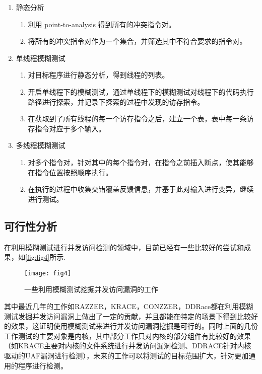\begin{enumerate}
\item 静态分析
\begin{enumerate}
\item 利用 point-to-analysis 得到所有的冲突指令对。
\item 将所有的冲突指令对作为一个集合，并筛选其中不符合要求的指令对。
\end{enumerate}

\item 单线程模糊测试
\begin{enumerate}
\item 对目标程序进行静态分析，得到线程的列表。
\item 开启单线程下的模糊测试，通过单线程下的模糊测试对线程下的代码执行路径进行探索，并记录下探索的过程中发现的访存指令。
\item 在获取到了所有线程的每一个访存指令之后，建立一个表，表中每一条访存指令对应于多个输入。
\end{enumerate}

\item 多线程模糊测试
\begin{enumerate}
\item 对多个指令对，针对其中的每个指令对，在指令之前插入断点，使其能够在指令位置按照顺序执行。
\item 在执行的过程中收集交错覆盖反馈信息，并基于此对输入进行变异，继续进行测试。
\end{enumerate}

\end{enumerate}

\subsection{可行性分析}

在利用模糊测试进行并发访问检测的领域中，目前已经有一些比较好的尝试和成果，如\autoref{fig:fig4}所示.

\begin{figure}[ht]
    \centering
    \texttt{[image: fig4]}
    \caption{\label{fig:fig4}一些利用模糊测试挖掘并发访问漏洞的工作}
\end{figure}

其中最近几年的工作如RAZZER\cite{jeong2019razzer}，KRACE\cite{xu2020krace}，CONZZER\cite{jiang2022context}，DDRace\cite{yuan2023ddrace}都在利用模糊测试发掘并发访问漏洞上做出了一定的贡献，并且都能在特定的场景下得到比较好的效果，这证明使用模糊测试来进行并发访问漏洞挖掘是可行的。同时上面的几份工作测试的主要对象是内核，其中部分工作只对内核的部分组件有比较好的效果（如KRACE主要对内核的文件系统进行并发访问漏洞检测、DDRACE针对内核驱动的UAF漏洞进行检测），未来的工作可以将测试的目标范围扩大，针对更加通用的程序进行检测。